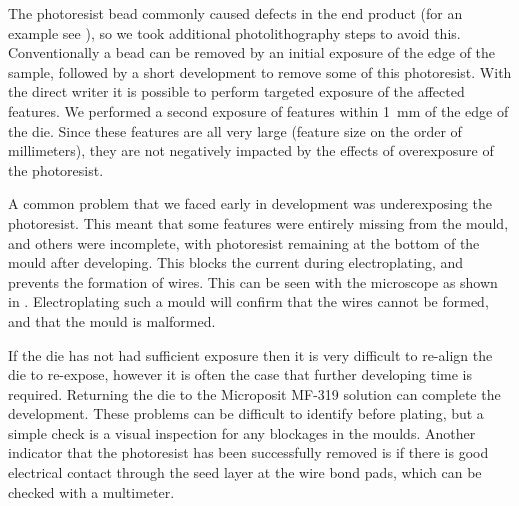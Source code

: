 The photoresist bead commonly caused defects in the end product (for an
example see ), so  we took additional photolithography
steps to avoid this. Conventionally a bead can be removed by an initial 
exposure of the edge of the sample, followed by a short development to remove
some of this photoresist. With the direct writer it is possible to perform
targeted exposure of the affected features. We performed a second exposure of
features within \SI{1}{\milli\meter} of the edge of the die. Since these
features are all very large (feature size on the order of millimeters), they
are not negatively impacted by the effects of overexposure of the photoresist.

A common problem that we faced early in development was underexposing the
photoresist. This meant that some features were entirely missing from the mould,
and others were incomplete, with photoresist remaining at the bottom of the
mould after developing. This blocks the current during electroplating, and
prevents the formation of wires. This can be seen with the microscope as shown in
. Electroplating such a mould will confirm that
the wires cannot be formed, and that the mould is malformed.

If the die has not had sufficient exposure then it is very difficult to
re-align the die to re-expose, however it is often the case that further
developing time is required. Returning the die to the Microposit MF-319
solution can complete the development.  These problems can be difficult to
identify before plating, but a simple check is a visual inspection for any
blockages in the moulds. Another indicator that the photoresist has been
successfully removed is if there is good electrical contact through the seed
layer at the wire bond pads, which can be checked with a multimeter.

